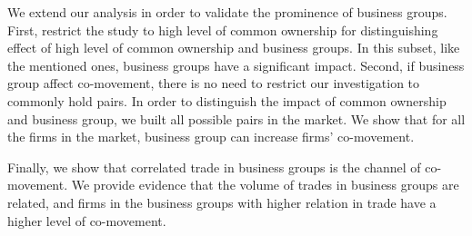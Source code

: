 	
	
	We extend our analysis in order to validate the prominence of business groups. First, restrict the study to high level of common ownership for distinguishing effect of high level of common ownership and business groups. 
	In this subset, like the mentioned ones, business groups have a significant impact.
	Second, if business group affect co-movement, there is no need to restrict our investigation to commonly hold pairs. In order to distinguish the impact of common ownership and business group, we built all possible pairs in the market.
	We show that for all the firms in the market, business group can increase firms' co-movement. 
	
	Finally, we show that correlated trade in business groups is the channel of co-movement. We provide evidence that the volume  of trades in business groups are related, and firms in the business groups with higher relation in trade have a higher level of co-movement.
	
	
	

%